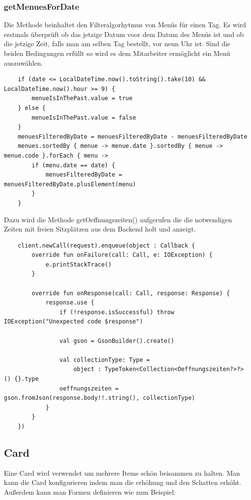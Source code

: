 \subsubsection{getMenuesForDate}
Die Methode beinhaltet den Filteralgorhytmus von Menüs für einen Tag. Es wird erstmals überprüft ob das jetzige Datum voor dem Datum des Menüs ist
und ob die jetzige Zeit, falls man am selben Tag bestellt, vor neun Uhr ist. Sind die beiden Bedingungen erfüllt so wird es dem Mitarbeiter ermöglicht ein Menü auszuwählen.

\begin{lstlisting}
    if (date <= LocalDateTime.now().toString().take(10) && LocalDateTime.now().hour >= 9) {
        menueIsInThePast.value = true
    } else {
        menueIsInThePast.value = false
    }
    menuesFilteredByDate = menuesFilteredByDate - menuesFilteredByDate
    menues.sortedBy { menue -> menue.date }.sortedBy { menue -> menue.code }.forEach { menu ->
        if (menu.date == date) {
            menuesFilteredByDate = menuesFilteredByDate.plusElement(menu)
        }
    }
\end{lstlisting}

Dazu wird die Methode getOeffnungszeiten() aufgerufen die die notwendigen Zeiten mit freien Sitzplätzen aus dem Backend holt und anzeigt.


\begin{lstlisting}
    client.newCall(request).enqueue(object : Callback {
        override fun onFailure(call: Call, e: IOException) {
            e.printStackTrace()
        }

        override fun onResponse(call: Call, response: Response) {
            response.use {
                if (!response.isSuccessful) throw IOException("Unexpected code $response")

                val gson = GsonBuilder().create()

                val collectionType: Type =
                    object : TypeToken<Collection<Oeffnungszeiten?>?>() {}.type
                oeffnungszeiten = gson.fromJson(response.body!!.string(), collectionType)
            }
        }
    })
\end{lstlisting}

\subsection{Card}
\cite{Card}
\author{Bozidar Spasenovic}

Eine Card wird verwendet um mehrere Items schön beisammen zu halten. Man kann die Card konfigurieren indem man die erhöhung und den Schatten erhöht.
Außerdem kann man Formen definieren wie zum Beispiel:


